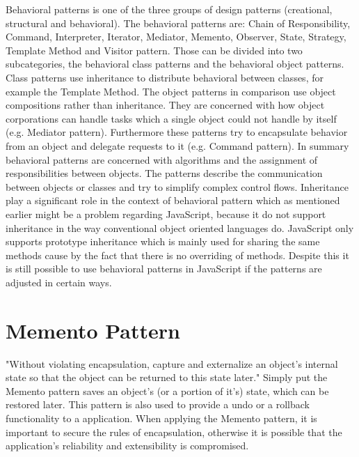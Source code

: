 \documentclass{bioinfo}
\begin{document}
Behavioral patterns is one of the three groups of design patterns (creational, structural and behavioral). The behavioral patterns are: Chain of Responsibility, Command, Interpreter, Iterator, Mediator, Memento, Observer, State, Strategy, Template Method and Visitor pattern. Those can be divided into two subcategories, the behavioral class patterns and the behavioral object patterns. Class patterns use inheritance to distribute behavioral between classes, for example the Template Method. The object patterns in comparison use object compositions rather than inheritance.  They are concerned with how object corporations can handle tasks which a single object could not handle by itself (e.g. Mediator pattern). Furthermore these patterns try to encapsulate behavior from an object and delegate requests to it (e.g. Command pattern). \cite{gang4}
In summary behavioral patterns are concerned with algorithms and the assignment of responsibilities between objects. The patterns describe the communication between objects or classes and try to simplify complex control flows.
Inheritance play a significant role in the context of behavioral pattern which as mentioned earlier might be a problem regarding JavaScript, because it do not support inheritance in the way conventional object oriented languages do. JavaScript only supports prototype inheritance which is mainly used for sharing the same methods cause by the fact that there is no overriding of methods.
Despite this it is still possible to use behavioral patterns in JavaScript if the patterns are adjusted in certain ways.

\section{Memento Pattern}
"Without violating encapsulation, capture and externalize an object's internal state so that the object can be returned to this state later." \cite{sourcem} Simply put the Memento pattern saves an object's (or a portion of it's) state, which can be restored later. This pattern is also used to provide a undo or a rollback functionality to a application. When applying the Memento pattern, it  is important to secure the rules of encapsulation, otherwise it is possible that the application's reliability and extensibility is compromised. \cite{gang4} 
\end{document}
